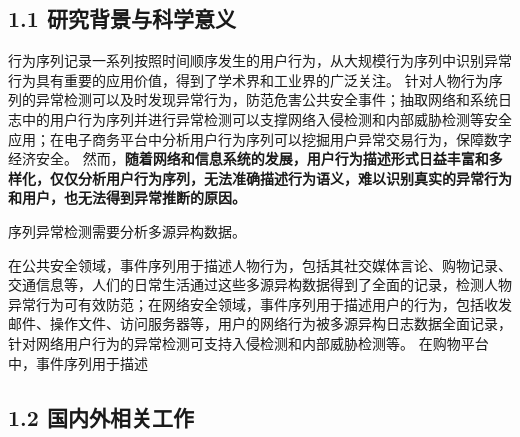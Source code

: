 \subsection{\sihao \kaishu \bfseries 1.1 研究背景与科学意义}

行为序列记录一系列按照时间顺序发生的用户行为，从大规模行为序列中识别异常行为具有重要的应用价值，得到了学术界和工业界的广泛关注。
针对人物行为序列的异常检测可以及时发现异常行为，防范危害公共安全事件；抽取网络和系统日志中的用户行为序列并进行异常检测可以支撑网络入侵检测和内部威胁检测等安全应用；在电子商务平台中分析用户行为序列可以挖掘用户异常交易行为，保障数字经济安全。
然而，\textbf{\songti 随着网络和信息系统的发展，用户行为描述形式日益丰富和多样化，仅仅分析用户行为序列，无法准确描述行为语义，难以识别真实的异常行为和用户，也无法得到异常推断的原因。}

序列异常检测需要分析多源异构数据。

在公共安全领域，事件序列用于描述人物行为，包括其社交媒体言论、购物记录、交通信息等，人们的日常生活通过这些多源异构数据得到了全面的记录，检测人物异常行为可有效防范；在网络安全领域，事件序列用于描述用户的行为，包括收发邮件、操作文件、访问服务器等，用户的网络行为被多源异构日志数据全面记录，针对网络用户行为的异常检测可支持入侵检测和内部威胁检测等。
在购物平台中，事件序列用于描述



\subsection{\sihao \songti \bfseries 1.2 国内外相关工作}


